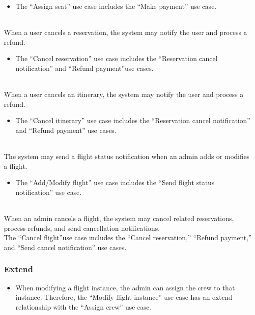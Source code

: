 \begin{itemize}
\item
The ``Assign seat'' use case includes the ``Make payment'' use case.
\end{itemize}
\\
When a user cancels a reservation, the system may notify the user and process a refund.

\begin{itemize}
\item
The ``Cancel reservation'' use case includes the ``Reservation cancel notification'' and ``Refund payment''use cases.
\end{itemize}
\\
When a user cancels an itinerary, the system may notify the user and process a refund.

\begin{itemize}
\item
The ``Cancel itinerary'' use case includes the ``Reservation cancel notification'' and ``Refund payment'' use cases.
\end{itemize}
\\
The system may send a flight status notification when an admin adds or modifies a flight.

\begin{itemize}
\item
The ``Add/Modify flight'' use case includes the ``Send flight status notification'' use case.
\end{itemize}
\\
When an admin cancels a flight, the system may cancel related reservations, process refunds, and send cancellation notifications.
\\
The ``Cancel flight''use case includes the ``Cancel reservation,'' ``Refund payment,'' and ``Send cancel notification'' use cases.

\subsubsection{Extend}\label{0B7e-M5yqOeIFscTLOTLB}

\begin{itemize}
\item
\protect{}\label{SaqYbgAJzaPyXRFJXCGmt}
When modifying a flight instance, the admin can assign the crew to that instance. Therefore, the ``Modify flight instance'' use case has an extend relationship with the ``Assign crew'' use case.
\end{itemize}

